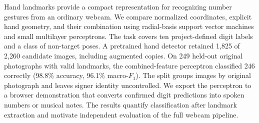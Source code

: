 Hand landmarks provide a compact representation for recognizing number
gestures from an ordinary webcam. We compare normalized coordinates, explicit
hand geometry, and their combination using radial-basis support vector machines
and small multilayer perceptrons. The task covers ten project-defined digit
labels and a class of non-target poses. A pretrained hand detector retained
1,825 of 2,260 candidate images, including augmented copies. On 249 held-out
original photographs with valid landmarks, the combined-feature perceptron
classified 246 correctly (98.8\% accuracy, 96.1\% macro-$F_1$). The split groups
images by original photograph and leaves signer identity uncontrolled. We
export the perceptron to a browser demonstration that converts confirmed digit
predictions into spoken numbers or musical notes. The results quantify
classification after landmark extraction and motivate independent evaluation of
the full webcam pipeline.
